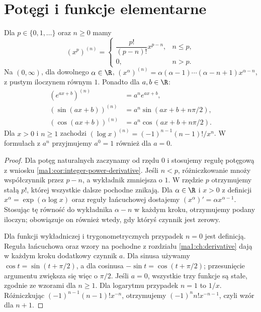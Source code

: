 \section{Potęgi i funkcje elementarne}
\begin{stwierdzenie}
\label{ma1:prop:higher-elementary}
Dla $p\in\{0,1,\ldots\}$ oraz $n\ge0$ mamy
\[
 (x^p)^{(n)}=
 \begin{cases}
 \dfrac{p!}{(p-n)!}x^{p-n},&n\le p,\\
 0,&n>p.
 \end{cases}
\]
Na $(0,\infty)$, dla dowolnego $\alpha\in\R$,
$(x^\alpha)^{(n)}=\alpha(\alpha-1)\cdots(\alpha-n+1)x^{\alpha-n}$, z pustym iloczynem równym $1$. Ponadto dla $a,b\in\R$:
\[
 \begin{aligned}
 (e^{ax+b})^{(n)}&=a^n e^{ax+b},\\
 (\sin(ax+b))^{(n)}&=a^n\sin(ax+b+n\pi/2),\\
 (\cos(ax+b))^{(n)}&=a^n\cos(ax+b+n\pi/2).
 \end{aligned}
\]
Dla $x>0$ i $n\ge1$ zachodzi $(\log x)^{(n)}=(-1)^{n-1}(n-1)!/x^n$. W formułach z $a^n$ przyjmujemy $a^0=1$ również dla $a=0$.
\end{stwierdzenie}
\begin{proof}
Dla potęg naturalnych zaczynamy od rzędu $0$ i stosujemy regułę potęgową z wniosku \ref{ma1:cor:integer-power-derivative}. Jeśli $n<p$, różniczkowanie mnoży współczynnik przez $p-n$, a wykładnik zmniejsza o $1$. W rzędzie $p$ otrzymujemy stałą $p!$, której wszystkie dalsze pochodne znikają. Dla $\alpha\in\R$ i $x>0$ z definicji $x^\alpha=\exp(\alpha\log x)$ oraz reguły łańcuchowej dostajemy $(x^\alpha)'=\alpha x^{\alpha-1}$. Stosując tę równość do wykładnika $\alpha-n$ w każdym kroku, otrzymujemy podany iloczyn; obowiązuje on również wtedy, gdy któryś czynnik jest zerowy.

Dla funkcji wykładniczej i trygonometrycznych przypadek $n=0$ jest definicją. Reguła łańcuchowa oraz wzory na pochodne z rozdziału \ref{ma1:ch:derivative} dają w każdym kroku dodatkowy czynnik $a$. Dla sinusa używamy $\cos t=\sin(t+\pi/2)$, a dla cosinusa $-\sin t=\cos(t+\pi/2)$; przesunięcie argumentu zwiększa się więc o $\pi/2$. Jeśli $a=0$, wszystkie trzy funkcje są stałe, zgodnie ze wzorami dla $n\ge1$. Dla logarytmu przypadek $n=1$ to $1/x$. Różniczkując $(-1)^{n-1}(n-1)!x^{-n}$, otrzymujemy $(-1)^n n!x^{-n-1}$, czyli wzór dla $n+1$.
\end{proof}


